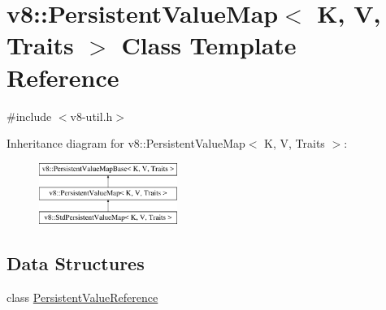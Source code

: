 \hypertarget{classv8_1_1PersistentValueMap}{\section{v8\-:\-:Persistent\-Value\-Map$<$ K, V, Traits $>$ Class Template Reference}
\label{classv8_1_1PersistentValueMap}
}


{\ttfamily \#include $<$v8-\/util.\-h$>$}

Inheritance diagram for v8\-:\-:Persistent\-Value\-Map$<$ K, V, Traits $>$\-:\begin{figure}[H]
\begin{center}
\leavevmode
\includegraphics[height=2.000000cm]{classv8_1_1PersistentValueMap}
\end{center}
\end{figure}
\subsection*{Data Structures}
\begin{DoxyCompactItemize}
\item 
class \hyperlink{classv8_1_1PersistentValueMap_1_1PersistentValueReference}{Persistent\-Value\-Reference}
\end{DoxyCompactItemize}
